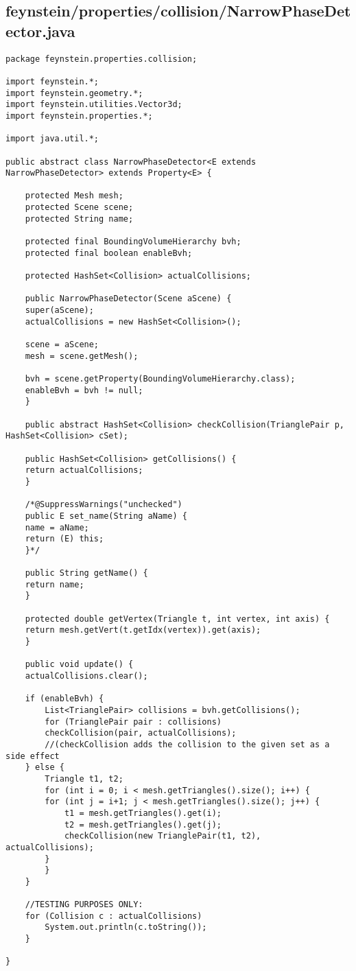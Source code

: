 \subsection*{feynstein/properties/collision/NarrowPhaseDetector.java}
\begin{lstlisting}
package feynstein.properties.collision;

import feynstein.*;
import feynstein.geometry.*;
import feynstein.utilities.Vector3d;
import feynstein.properties.*;

import java.util.*;

public abstract class NarrowPhaseDetector<E extends NarrowPhaseDetector> extends Property<E> {
    
    protected Mesh mesh;
    protected Scene scene;
    protected String name;

    protected final BoundingVolumeHierarchy bvh;
    protected final boolean enableBvh;

    protected HashSet<Collision> actualCollisions;

    public NarrowPhaseDetector(Scene aScene) {
	super(aScene);
	actualCollisions = new HashSet<Collision>();

	scene = aScene;
	mesh = scene.getMesh();

	bvh = scene.getProperty(BoundingVolumeHierarchy.class);
	enableBvh = bvh != null;
    }

    public abstract HashSet<Collision> checkCollision(TrianglePair p, HashSet<Collision> cSet);

    public HashSet<Collision> getCollisions() {
	return actualCollisions;
    }

    /*@SuppressWarnings("unchecked")
    public E set_name(String aName) {
	name = aName;
	return (E) this;
	}*/

    public String getName() {
	return name;
    }

    protected double getVertex(Triangle t, int vertex, int axis) {
	return mesh.getVert(t.getIdx(vertex)).get(axis);
    }

    public void update() {
	actualCollisions.clear();

	if (enableBvh) {
	    List<TrianglePair> collisions = bvh.getCollisions();
	    for (TrianglePair pair : collisions)
		checkCollision(pair, actualCollisions);
		//(checkCollision adds the collision to the given set as a side effect
	} else {
	    Triangle t1, t2;
	    for (int i = 0; i < mesh.getTriangles().size(); i++) {
		for (int j = i+1; j < mesh.getTriangles().size(); j++) {
		    t1 = mesh.getTriangles().get(i);
		    t2 = mesh.getTriangles().get(j);
		    checkCollision(new TrianglePair(t1, t2), actualCollisions);
		}
	    }
	}
	
	//TESTING PURPOSES ONLY:
	for (Collision c : actualCollisions)
	    System.out.println(c.toString());
    }

}\end{lstlisting}

